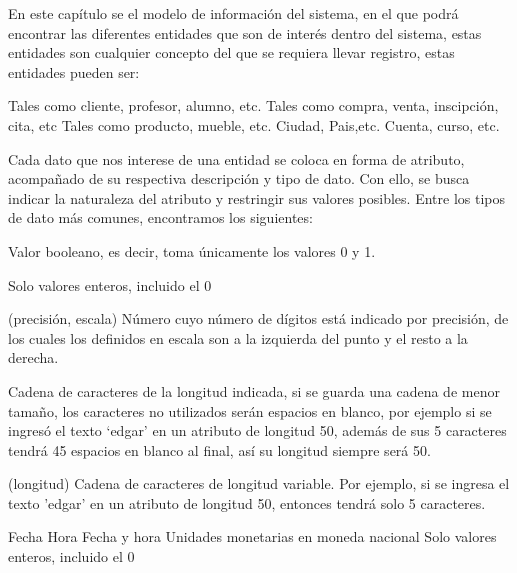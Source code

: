 En este capítulo se  el modelo de información del sistema, en el que podrá encontrar las diferentes entidades que son de interés dentro del sistema, estas entidades son cualquier concepto del que se requiera llevar registro, estas entidades pueden ser:

    \begin{bGlosario}
         Tales como cliente, profesor, alumno, etc.
           Tales como compra, venta, inscipción, cita, etc
           Tales como producto, mueble, etc.
               Ciudad, Pais,etc.
         Cuenta, curso, etc.
    \end{bGlosario}

Cada dato que nos interese de una entidad se coloca en forma de atributo, acompañado de su respectiva descripción y tipo de dato. Con ello, se busca indicar la naturaleza del atributo y restringir sus valores posibles. Entre los tipos de dato más comunes, encontramos los siguientes:

    \begin{bGlosario}
	    Valor booleano, es decir, toma únicamente los valores 0 y 1.

            Solo valores enteros, incluido el 0
            
         (precisión, escala)
            Número cuyo número de dígitos está indicado por precisión, de los cuales
            los definidos en escala son a la izquierda del punto y el resto a la derecha.
            
            Cadena de caracteres de la longitud indicada, si se guarda una cadena de menor
            tamaño, los caracteres no utilizados serán espacios en blanco, por ejemplo si
            se ingresó el texto ‘edgar’ en un atributo de longitud 50, además de sus 5 caracteres
            tendrá 45 espacios en blanco al final, así su longitud siempre será 50.
            
         (longitud)
            Cadena de caracteres de longitud variable. Por ejemplo, si se ingresa el texto 'edgar'
            en un atributo de longitud 50, entonces tendrá solo 5 caracteres.
            
         Fecha
         Hora
         Fecha y hora
         Unidades monetarias en moneda nacional
    Solo valores enteros, incluido el 0
    \end{bGlosario}

